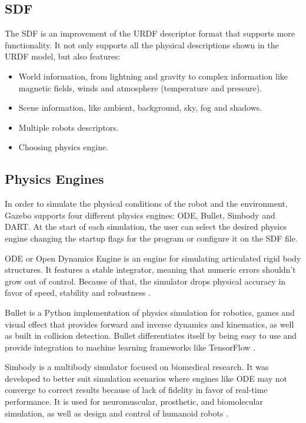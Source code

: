 \subsection{SDF}

The SDF is an improvement of the URDF descriptor format that supports more functionality. It not only supports all the physical descriptions shown in the URDF model, but also features:

\begin{itemize}
\item World information, from lightning and gravity to complex information like magnetic fields, winds and atmosphere (temperature and pressure).
\item Scene information, like ambient, background, sky, fog and shadows.
\item Multiple robots descriptors.
\item Choosing physics engine.
\end{itemize}

\subsection{Physics Engines}

In order to simulate the physical conditions of the robot and the environment, Gazebo supports four different physics engines: ODE, Bullet, Simbody and DART. At the start of each simulation, the user can select the desired physics engine changing the startup flags for the program or configure it on the SDF file.

ODE or Open Dynamics Engine is an engine for simulating articulated rigid body structures. It features a stable integrator, meaning that numeric errors shouldn't grow out of control. Because of that, the simulator drops physical accuracy in favor of speed, stability and robustness \cite{smith2005open}.

Bullet is a Python implementation of physics simulation for robotics, games and visual effect that provides forward and inverse dynamics and kinematics, as well as built in collision detection. Bullet differentiates itself by being easy to use and provide integration to machine learning frameworks like TensorFlow \cite{coumans2018}.

Simbody is a multibody simulator focused on biomedical research. It was developed to better suit simulation scenarios where engines like ODE may not converge to correct results because of lack of fidelity in favor of real-time performance. It is used for neuromuscular, prosthetic, and biomolecular simulation, as well as design and control of humanoid robots \cite{sherman2011simbody}.

